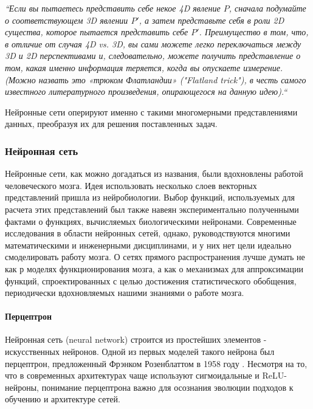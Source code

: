 \begin{quoting}
    \itshape
    “Если вы пытаетесь представить себе некое 4D явление $P$, 
    сначала подумайте о соответствующем 3D явлении $P'$, 
    а затем представьте себя в роли 2D существа, которое 
    пытается представить себе $P'$. Преимущество в том, что, в отличие 
    от случая 4D vs. 3D, вы сами можете легко переключаться между 3D 
    и 2D перспективами и, следовательно, можете получить представление 
    о том, какая именно информация теряется, когда вы опускаете измерение. 
    (Можно назвать это «трюком Флатландии» ("Flatland trick"), в честь самого 
    известного литературного произведения, опирающегося на данную идею).“
\end{quoting}

Нейронные сети оперируют именно с такими многомерными представлениями данных, 
преобразуя их для решения поставленных задач.

\subsubsection{Нейронная сеть}

Нейронные сети, как можно догадаться из названия, были вдохновлены работой человеческого 
мозга. Идея использовать несколько слоев векторных представлений пришла из нейробиологии. 
Выбор функций, используемых для расчета этих представлений был также навеян 
экспериментально полученными фактами о функциях, вычисляемых биологическими нейронами. 
Современные исследования в области нейронных сетей, однако, руководствуются 
многими математическими и инженерными дисциплинами, и у них нет цели идеально 
смоделировать работу мозга. О сетях прямого распространения лучше думать 
не как р моделях функционирования мозга, а как о 
механизмах для аппроксимации функций, спроектированных с целью достижения 
статистического обобщения, периодически вдохновляемых нашими знаниями о работе 
мозга.

\paragraph{Перцептрон}

Нейронная сеть (neural network) строится из простейших элементов - искусственных 
нейронов. Одной из первых моделей такого нейрона был перцептрон, 
предложенный Фрэнком Розенблаттом в 1958 году \cite{Rosenblatt_perceptron}. Несмотря на то, что в 
современных архитектурах чаще используют сигмоидальные и ReLU-нейроны, 
понимание перцептрона важно для осознания эволюции подходов к обучению 
и архитектуре сетей.

